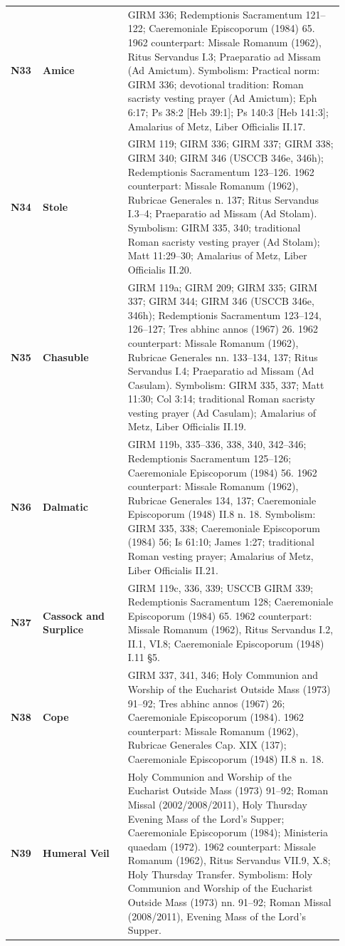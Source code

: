 {\begin{longtable}{>{\raggedright\arraybackslash}p{0.08\linewidth}>{\raggedright\arraybackslash}p{0.24\linewidth}>{\raggedright\arraybackslash}p{0.61\linewidth}}
\textbf{N33} & \textbf{Amice} & GIRM 336; Redemptionis Sacramentum 121--122; Caeremoniale Episcoporum (1984) 65. 1962 counterpart: Missale Romanum (1962), Ritus Servandus I.3; Praeparatio ad Missam (Ad Amictum). Symbolism: Practical norm: GIRM 336; devotional tradition: Roman sacristy vesting prayer (Ad Amictum); Eph 6:17; Ps 38:2 [Heb 39:1]; Ps 140:3 [Heb 141:3]; Amalarius of Metz, Liber Officialis II.17. \\
\textbf{N34} & \textbf{Stole} & GIRM 119; GIRM 336; GIRM 337; GIRM 338; GIRM 340; GIRM 346 (USCCB 346e, 346h); Redemptionis Sacramentum 123--126. 1962 counterpart: Missale Romanum (1962), Rubricae Generales n. 137; Ritus Servandus I.3--4; Praeparatio ad Missam (Ad Stolam). Symbolism: GIRM 335, 340; traditional Roman sacristy vesting prayer (Ad Stolam); Matt 11:29--30; Amalarius of Metz, Liber Officialis II.20. \\
\textbf{N35} & \textbf{Chasuble} & GIRM 119a; GIRM 209; GIRM 335; GIRM 337; GIRM 344; GIRM 346 (USCCB 346e, 346h); Redemptionis Sacramentum 123--124, 126--127; Tres abhinc annos (1967) 26. 1962 counterpart: Missale Romanum (1962), Rubricae Generales nn. 133--134, 137; Ritus Servandus I.4; Praeparatio ad Missam (Ad Casulam). Symbolism: GIRM 335, 337; Matt 11:30; Col 3:14; traditional Roman sacristy vesting prayer (Ad Casulam); Amalarius of Metz, Liber Officialis II.19. \\
\textbf{N36} & \textbf{Dalmatic} & GIRM 119b, 335--336, 338, 340, 342--346; Redemptionis Sacramentum 125--126; Caeremoniale Episcoporum (1984) 56. 1962 counterpart: Missale Romanum (1962), Rubricae Generales 134, 137; Caeremoniale Episcoporum (1948) II.8 n. 18. Symbolism: GIRM 335, 338; Caeremoniale Episcoporum (1984) 56; Is 61:10; James 1:27; traditional Roman vesting prayer; Amalarius of Metz, Liber Officialis II.21. \\
\textbf{N37} & \textbf{Cassock and Surplice} & GIRM 119c, 336, 339; USCCB GIRM 339; Redemptionis Sacramentum 128; Caeremoniale Episcoporum (1984) 65. 1962 counterpart: Missale Romanum (1962), Ritus Servandus I.2, II.1, VI.8; Caeremoniale Episcoporum (1948) I.11 §5. \\
\textbf{N38} & \textbf{Cope} & GIRM 337, 341, 346; Holy Communion and Worship of the Eucharist Outside Mass (1973) 91--92; Tres abhinc annos (1967) 26; Caeremoniale Episcoporum (1984). 1962 counterpart: Missale Romanum (1962), Rubricae Generales Cap. XIX (137); Caeremoniale Episcoporum (1948) II.8 n. 18. \\
\textbf{N39} & \textbf{Humeral Veil} & Holy Communion and Worship of the Eucharist Outside Mass (1973) 91--92; Roman Missal (2002/2008/2011), Holy Thursday Evening Mass of the Lord's Supper; Caeremoniale Episcoporum (1984); Ministeria quaedam (1972). 1962 counterpart: Missale Romanum (1962), Ritus Servandus VII.9, X.8; Holy Thursday Transfer. Symbolism: Holy Communion and Worship of the Eucharist Outside Mass (1973) nn. 91--92; Roman Missal (2008/2011), Evening Mass of the Lord's Supper. \\

\end{longtable}}

